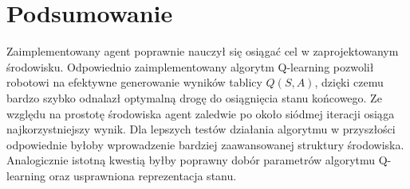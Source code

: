 \chapter{Podsumowanie}
\label{cha:podsumowanie}

Zaimplementowany agent poprawnie nauczył się osiągać cel w zaprojektowanym środowisku. Odpowiednio zaimplementowany 
algorytm Q-learning pozwolił robotowi na efektywne generowanie wyników tablicy $Q(S, A)$, dzięki czemu bardzo szybko 
odnalazł optymalną drogę do osiągnięcia stanu końcowego. Ze względu na prostotę środowiska agent 
zaledwie po około siódmej iteracji osiąga najkorzystniejszy wynik. Dla lepszych testów działania algorytmu w 
przyszłości odpowiednie byłoby wprowadzenie bardziej zaawansowanej struktury środowiska. Analogicznie istotną kwestią 
byłby poprawny dobór parametrów algorytmu Q-learning oraz usprawniona reprezentacja stanu.